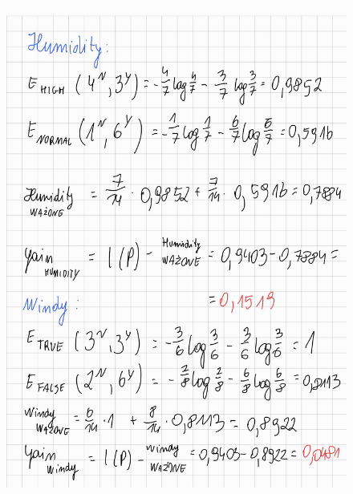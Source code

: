 \documentclass{article}
\begin{document}
\begin{figure}[H]
    \centering
    \includegraphics[width=\textwidth]{tree2.jpg}
\end{figure}
\end{document}
